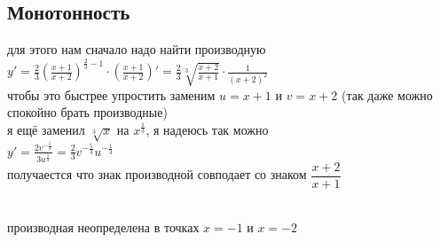 \documentclass{article}
\newcommand{\ds}{\displaystyle}
\begin{document}
  \subsection{Монотонность}
  для этого нам сначало надо найти производную \\
  $\ds y' = \frac{2}{3}\left(\frac{x+1}{x+2}\right)^{\frac{2}{3}-1} \cdot \left(\frac{x+1}{x+2}\right)'
  = \frac{2}{3} \sqrt[3]{\frac{x+2}{x+1}} \cdot \frac{1}{(x+2)^2}
  $ \\
  чтобы это быстрее упростить заменим $u = x+1$ и $v = x+2$ (так даже можно спокойно брать производные) \\
  я ещё заменил $\sqrt[3]{x}$ на $x^{\frac{1}{3}}$, я надеюсь так можно \\
  $\ds y' = \frac{2v^{-\frac{5}{3}}}{3u^{\frac{1}{3}}} = \frac{2}{3} v^{-\frac{5}{3}} u^{-\frac{1}{3}} $ \\
  получаестся что знак производной совподает со знаком $\dfrac{x+2}{x+1}$ \\
   \\
  производная неопределена в точках $x=-1$ и $x=-2$
\end{document}
